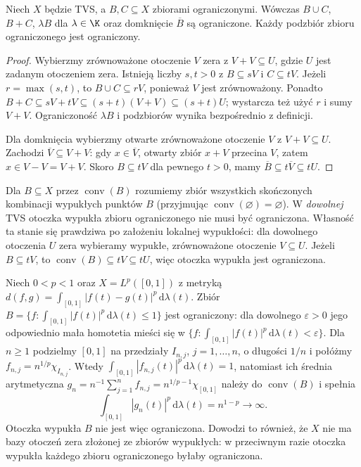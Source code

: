 \begin{stwierdzenie}
\label{prop:bounded-operations}
Niech $X$ będzie TVS, a $B,C\subseteq X$ zbiorami ograniczonymi.
Wówczas $B\cup C$, $B+C$, $\lambda B$ dla $\lambda\in\K$
oraz domknięcie $\overline B$ są ograniczone. Każdy podzbiór
zbioru ograniczonego jest ograniczony.
\end{stwierdzenie}
\begin{proof}
Wybierzmy zrównoważone otoczenie $V$ zera z
$V+V\subseteq U$, gdzie $U$ jest zadanym otoczeniem zera.
Istnieją liczby $s,t>0$ z $B\subseteq sV$ i $C\subseteq tV$.
Jeżeli $r=\max(s,t)$, to $B\cup C\subseteq rV$, ponieważ
$V$ jest zrównoważony. Ponadto
$B+C\subseteq sV+tV\subseteq (s+t)(V+V)\subseteq(s+t)U$;
wystarcza też użyć $r$ i sumy $V+V$. Ograniczoność
$\lambda B$ i podzbiorów wynika bezpośrednio z definicji.

Dla domknięcia wybierzmy otwarte zrównoważone otoczenie
$V$ z $V+V\subseteq U$. Zachodzi $\overline V\subseteq V+V$:
gdy $x\in\overline V$, otwarty zbiór $x+V$ przecina $V$,
zatem $x\in V-V=V+V$. Skoro $B\subseteq tV$ dla pewnego
$t>0$, mamy
$\overline B\subseteq t\overline V\subseteq tU$.
\end{proof}

\begin{uwaga}
Dla $B\subseteq X$ przez $\operatorname{conv}(B)$ rozumiemy
zbiór wszystkich skończonych kombinacji wypukłych punktów $B$
(przyjmując $\operatorname{conv}(\varnothing)=\varnothing$).
W \emph{dowolnej} TVS otoczka wypukła zbioru ograniczonego
nie musi być ograniczona. Własność ta stanie się prawdziwa
po założeniu lokalnej wypukłości: dla dowolnego otoczenia
$U$ zera wybieramy wypukłe, zrównoważone otoczenie
$V\subseteq U$. Jeżeli $B\subseteq tV$, to
$\operatorname{conv}(B)\subseteq tV\subseteq tU$, więc
otoczka wypukła jest ograniczona.
\end{uwaga}

\begin{przyklad}
\label{ex:quasinorm-convex-hull}
Niech $0<p<1$ oraz $X=L^p([0,1])$ z metryką
$d(f,g)=\int_{[0,1]}|f(t)-g(t)|^p\,\mathrm d\lambda(t)$.
Zbiór $B=\{f:\int_{[0,1]}|f(t)|^p\,\mathrm d\lambda(t)\le1\}$ jest
ograniczony: dla dowolnego $\varepsilon>0$ jego odpowiednio
mała homotetia mieści się w
$\{f:\int_{[0,1]}|f(t)|^p\,\mathrm d\lambda(t)<\varepsilon\}$.
Dla $n\ge1$ podzielmy $[0,1]$ na przedziały $I_{n,j}$,
$j=1,\ldots,n$, o długości $1/n$ i połóżmy
$f_{n,j}=n^{1/p}\chi_{I_{n,j}}$. Wtedy
$\int_{[0,1]}|f_{n,j}(t)|^p\,\mathrm d\lambda(t)=1$,
natomiast ich średnia arytmetyczna
$g_n=n^{-1}\sum_{j=1}^n f_{n,j}=n^{1/p-1}\chi_{[0,1]}$
należy do $\operatorname{conv}(B)$ i spełnia
\[
 \int_{[0,1]}|g_n(t)|^p\,\mathrm d\lambda(t)=n^{1-p}\longrightarrow\infty.
\]
Otoczka wypukła $B$ nie jest więc ograniczona. Dowodzi to
również, że $X$ nie ma bazy otoczeń zera złożonej ze
zbiorów wypukłych: w przeciwnym razie otoczka wypukła
każdego zbioru ograniczonego byłaby ograniczona.
\end{przyklad}

